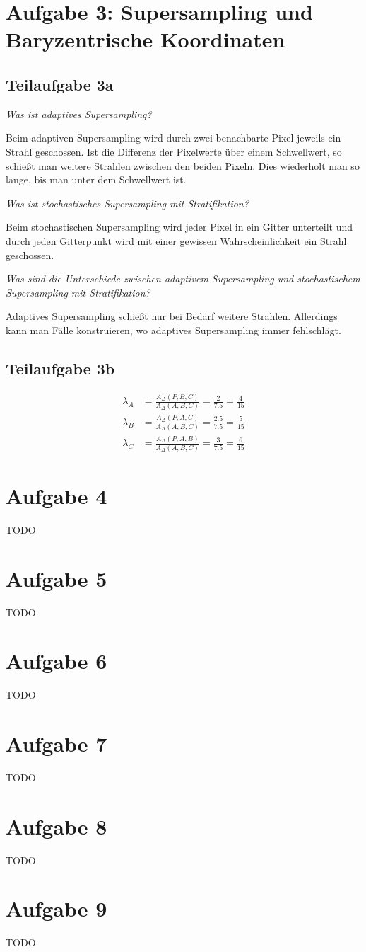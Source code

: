 \documentclass[a4paper]{scrartcl}
\begin{document}
\section*{Aufgabe 3: Supersampling und Baryzentrische Koordinaten}
\subsection*{Teilaufgabe 3a}
\textit{Was ist adaptives Supersampling?}

Beim adaptiven Supersampling wird durch zwei benachbarte Pixel jeweils ein
Strahl geschossen. Ist die Differenz der Pixelwerte über einem Schwellwert, so
schießt man weitere Strahlen zwischen den beiden Pixeln. Dies wiederholt man
so lange, bis man unter dem Schwellwert ist.

\textit{Was ist stochastisches Supersampling mit Stratifikation?}

Beim stochastischen Supersampling wird jeder Pixel in ein Gitter unterteilt
und durch jeden Gitterpunkt wird mit einer gewissen Wahrscheinlichkeit ein
Strahl geschossen.

\textit{Was sind die Unterschiede zwischen adaptivem Supersampling und stochastischem
Supersampling mit Stratifikation?}

Adaptives Supersampling schießt nur bei Bedarf weitere Strahlen. Allerdings
kann man Fälle konstruieren, wo adaptives Supersampling immer fehlschlägt.

\subsection*{Teilaufgabe 3b}

\begin{align}
    \lambda_A &= \frac{A_\Delta(P,B,C)}{A_\Delta(A,B,C)} = \frac{2}{7.5} = \frac{4}{15}\\
    \lambda_B &= \frac{A_\Delta(P,A,C)}{A_\Delta(A,B,C)} = \frac{2.5}{7.5} = \frac{5}{15}\\
    \lambda_C &= \frac{A_\Delta(P,A,B)}{A_\Delta(A,B,C)} = \frac{3}{7.5} = \frac{6}{15}
\end{align}

\section*{Aufgabe 4}
TODO

\section*{Aufgabe 5}
TODO

\section*{Aufgabe 6}
TODO

\section*{Aufgabe 7}
TODO

\section*{Aufgabe 8}
TODO

\section*{Aufgabe 9}
TODO

\end{document}
